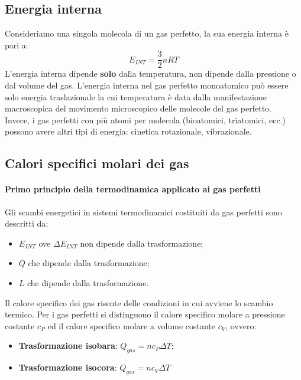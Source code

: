 \documentclass[12pt]{report}
\begin{document}
	\subsection{Energia interna}
	Consideriamo una singola molecola di un gas perfetto, la sua energia interna è pari a:
	\[
	E_{INT} = \frac{3}{2}nRT
	\]
	L'energia interna dipende \textbf{solo} dalla temperatura, non dipende dalla pressione o dal volume del gas. L'energia interna nel gas perfetto monoatomico può essere solo energia traslazionale la cui temperatura è data dalla manifestazione macroscopica del movimento microscopico delle molecole del gas perfetto. \\
	Invece, i gas perfetti con più atomi per molecola (bioatomici, triatomici, ecc.) possono avere altri tipi di energia: cinetica rotazionale, vibrazionale.
	\subsection{Calori specifici molari dei gas}
	{\paragraph{Primo principio della termodinamica applicato ai gas perfetti}
	Gli scambi energetici in sistemi termodinamici costituiti da gas perfetti sono descritti da:
	\begin{itemize}
		\item $E_{INT}$ ove $\Delta E_{INT}$ non dipende dalla trasformazione;
		\item $Q$ che dipende dalla trasformazione;
		\item $L$ che dipende dalla trasformazione.
	\end{itemize}
	}
	Il calore specifico dei gas risente delle condizioni in cui avviene lo scambio termico. Per i gas perfetti si distinguono il calore specifico molare a pressione costante $c_P$ ed il calore specifico molare a volume costante $c_V$, ovvero:
	\begin{itemize}
		\item \textbf{Trasformazione isobara}: $Q_{gas} = nc_P\Delta T$;
		\item \textbf{Trasformazione isocora}: $Q_{gas} = nc_V\Delta T$
	\end{itemize}
\end{document}
